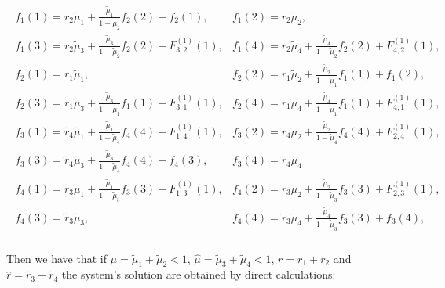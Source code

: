 \documentclass{article}
\begin{document}
\begin{eqnarray*}
\begin{array}{ll}
f_{1}\left(1\right)=r_{2}\tilde{\mu}_{1}+\frac{\tilde{\mu}_{1}}{1-\tilde{\mu}_{2}}f_{2}\left(2\right)+f_{2}\left(1\right),&
f_{1}\left(2\right)=r_{2}\tilde{\mu}_{2},\\
f_{1}\left(3\right)=r_{2}\tilde{\mu}_{3}+\frac{\tilde{\mu}_{3}}{1-\tilde{\mu}_{2}}f_{2}\left(2\right)+F_{3,2}^{(1)}\left(1\right),&
f_{1}\left(4\right)=r_{2}\tilde{\mu}_{4}+\frac{\tilde{\mu}_{4}}{1-\tilde{\mu}_{2}}f_{2}\left(2\right)+F_{4,2}^{(1)}\left(1\right),\\
f_{2}\left(1\right)=r_{1}\tilde{\mu}_{1},&
f_{2}\left(2\right)=r_{1}\tilde{\mu}_{2}+\frac{\tilde{\mu}_{2}}{1-\tilde{\mu}_{1}}f_{1}\left(1\right)+f_{1}\left(2\right),\\
f_{2}\left(3\right)=r_{1}\tilde{\mu}_{3}+\frac{\tilde{\mu}_{3}}{1-\tilde{\mu}_{1}}f_{1}\left(1\right)+F_{3,1}^{(1)}\left(1\right),&
f_{2}\left(4\right)=r_{1}\tilde{\mu}_{4}+\frac{\tilde{\mu}_{4}}{1-\tilde{\mu}_{1}}f_{1}\left(1\right)+F_{4,1}^{(1)}\left(1\right),\\
f_{3}\left(1\right)=\tilde{r}_{4}\tilde{\mu}_{1}+\frac{\tilde{\mu}_{1}}{1-\tilde{\mu}_{4}}f_{4}\left(4\right)+F_{1,4}^{(1)}\left(1\right),&
f_{3}\left(2\right)=\tilde{r}_{4}\tilde{\mu}_{2}+\frac{\tilde{\mu}_{2}}{1-\tilde{\mu}_{4}}f_{4}\left(4\right)+F_{2,4}^{(1)}\left(1\right),\\
f_{3}\left(3\right)=\tilde{r}_{4}\tilde{\mu}_{3}+\frac{\tilde{\mu}_{3}}{1-\tilde{\mu}_{4}}f_{4}\left(4\right)+f_{4}\left(3\right),&
f_{3}\left(4\right)=\tilde{r}_{4}\tilde{\mu}_{4}\\
f_{4}\left(1\right)=\tilde{r}_{3}\tilde{\mu}_{1}+\frac{\tilde{\mu}_{1}}{1-\tilde{\mu}_{3}}f_{3}\left(3\right)+F_{1,3}^{(1)}\left(1\right),&
f_{4}\left(2\right)=\tilde{r}_{3}\mu_{2}+\frac{\tilde{\mu}_{2}}{1-\tilde{\mu}_{3}}f_{3}\left(3\right)+F_{2,3}^{(1)}\left(1\right),\\
f_{4}\left(3\right)=\tilde{r}_{3}\tilde{\mu}_{3},&
f_{4}\left(4\right)=\tilde{r}_{3}\tilde{\mu}_{4}+\frac{\tilde{\mu}_{4}}{1-\tilde{\mu}_{3}}f_{3}\left(3\right)+f_{3}\left(4\right),\\
\end{array}
\end{eqnarray*}

Then we have that if $\mu=\tilde{\mu}_{1}+\tilde{\mu}_{2}<1$, $\hat{\mu}=\tilde{\mu}_{3}+\tilde{\mu}_{4}<1$, $r=r_{1}+r_{2}$ and $\hat{r}=\tilde{r}_{3}+\tilde{r}_{4}$  the system's solution are obtained by direct calculations:
\end{document}
